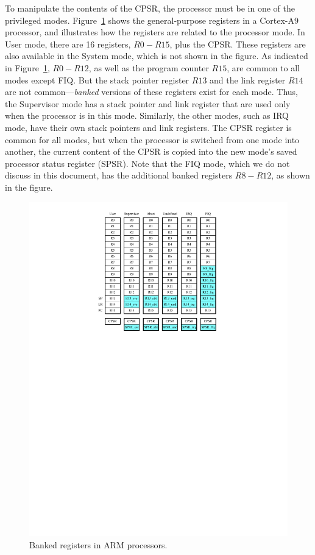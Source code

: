 \documentclass[11pt, twoside, pdftex]{article}
\begin{document}
To manipulate the contents of the CPSR, the processor must be 
in one of the privileged modes.  Figure~\ref{fig:arm_banked_regs} shows the
general-purpose registers in a Cortex-A9 processor, and illustrates how the registers are
related to the processor mode.  In User mode, there are 16 registers, $R0 - R15$, plus the
CPSR. These registers are also available in the System mode, which is not shown in the
figure. As indicated in Figure~\ref{fig:arm_banked_regs}, $R0 - R12$, as well as the program 
counter $R15$, are common to all modes except FIQ. But the 
stack pointer register $R13$ and the link register $R14$ are not common---{\it banked} 
versions of these registers exist for each mode. Thus, the Supervisor mode has a stack pointer and
link register that are used only when the processor is in this mode. Similarly, the
other modes, such as IRQ mode, have their own stack pointers and 
link registers. The CPSR register is common for all modes, but when the processor is
switched from one mode into another, the current content of the CPSR is copied into the new 
mode's saved processor status register (SPSR). Note that the FIQ mode, which we do not
discuss in this document, has the additional banked registers $R8 - R12$, as shown in the figure.

\begin{figure}[h!]
   \begin{center}
       \includegraphics{figures/arm_banked_regs.pdf}
   \end{center}
   \caption{Banked registers in ARM processors.}
	\label{fig:arm_banked_regs}
\end{figure}
\end{document}

